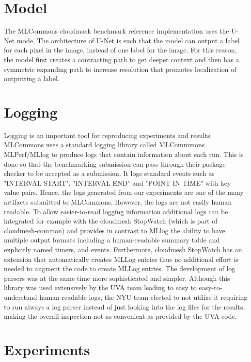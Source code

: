 \documentclass[sigplan,screen]{acmart}
\begin{document}
\section{Model}

The MLCommons cloudmask benchmark \cite{Thiyagalingam2022AIBF} reference implementation uses the U-Net \cite{Ronneberger2015UNetCN} mode. The architecture of U-Net is such that the model can output a label for each pixel in the image, instead of one label for the image. For this reason, the model first creates a contracting path to get deeper context and then has a symmetric expanding path to increase resolution that promotes localization of outputting a label.

\section{Logging}

Logging is an important tool for reproducing experiments and results. MLCommons uses a standard logging library called MLCommmons MLPerf/MLlog \cite{github-mlcommons-logging} to produce logs that contain information about each run. This is done so that the benchmarking submission can pass through their package checker to be accepted as a submission. It logs standard events such as "INTERVAL START", "INTERVAL END" and "POINT IN TIME" with key-value pairs. Hence, the logs generated from our experiments are one of the many artifacts submitted to MLCommons. 
However, the logs are not easily human readable. To allow easier-to-read logging information additional logs can be integrated for example with the cloudmesh StopWatch  (which is part of cloudmesh-common) \citep{cloudmesh-stopwatch} and provides in contrast to MLlog the ability to have multiple output formats including a human-readable summary table and explicitly named timers, and events.  Furthermore, cloudmesh StopWatch has an extension that automatically creates MLLog entries thus no additional effort is needed to augment the code to create MLLog entries. The development of log parsers was at the same time more sophisticated and simpler. Although this library was used extensively by the UVA team leading to easy to easy-to-understand human readable logs, the NYU team elected to not utilize it requiring to run always a log parser instead of just looking into the log files for the results, making the overall inspection not as convenient as provided by the UVA code.

\section{Experiments}
\label{sec:exp}
\end{document}

